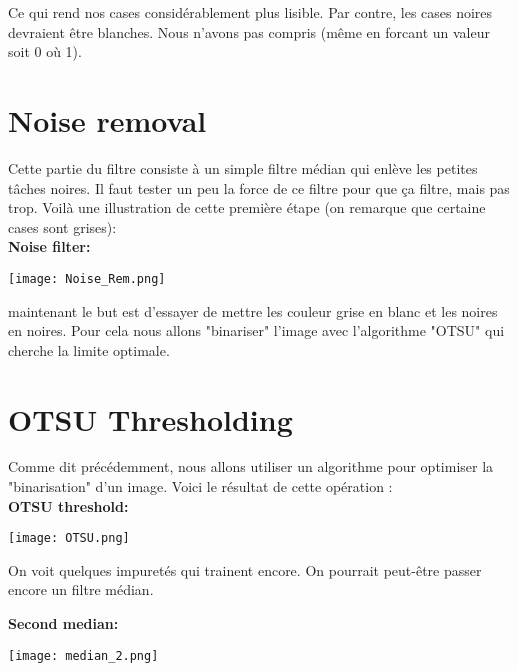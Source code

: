 Ce qui rend nos cases considérablement plus lisible. Par contre, les cases noires devraient être blanches. Nous n'avons pas compris (même en forcant un valeur soit 0 où 1).

\pagebreak
\section{Noise removal}

Cette partie du filtre consiste à un simple filtre médian qui enlève les petites tâches noires. Il faut tester un peu la force de ce filtre pour que ça filtre, mais pas trop. Voilà une illustration de cette première étape (on remarque que certaine cases sont grises):\\

\textbf{Noise filter:}
\begin{center} 
\hspace{15cm}
\texttt{[image: Noise\_Rem.png]}
\end{center}
\vspace{0.5cm} 

maintenant le but est d'essayer de mettre les couleur grise en blanc et les noires en noires. Pour cela nous allons "binariser" l'image avec l'algorithme "OTSU" qui cherche la limite optimale.


\pagebreak
\section{OTSU Thresholding}

Comme dit précédemment, nous allons utiliser un algorithme pour optimiser la "binarisation" d'un image. Voici le résultat de cette opération :\\

\textbf{OTSU threshold:}
\begin{center} 
\hspace{15cm}
\texttt{[image: OTSU.png]}
\end{center}
\vspace{0.5cm} 

On voit quelques impuretés qui trainent encore. On pourrait peut-être passer encore un filtre médian.

\textbf{Second median:}
\begin{center} 
\hspace{15cm}
\texttt{[image: median\_2.png]}
\end{center}
\vspace{0.5cm} 

